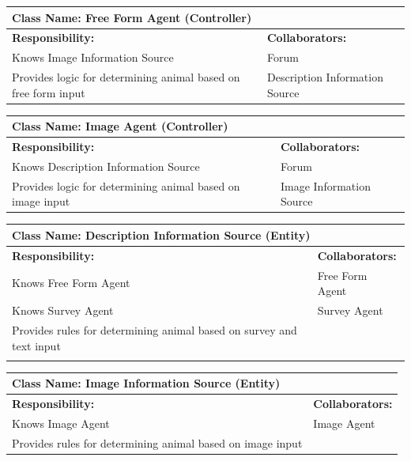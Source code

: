 \documentclass[]{article}
\begin{document}
    	\begin{table}[H]
		\centering
		\begin{tabular}{|p{7cm}|p{7cm}|}
		\hline 
		 \multicolumn{2}{|l|}{\textbf{Class Name: Free Form Agent (Controller)}} \\
		\hline
		\textbf{Responsibility:} & \textbf{Collaborators:} \\
		\hline
		Knows Image Information Source & Forum \\
        Provides logic for determining animal based on free form input & Description Information Source \\

		\hline
		\end{tabular}
	\end{table}


    	\begin{table}[H]
		\centering
		\begin{tabular}{|p{7cm}|p{7cm}|}
		\hline 
		 \multicolumn{2}{|l|}{\textbf{Class Name: Image Agent (Controller)}} \\
		\hline
		\textbf{Responsibility:} & \textbf{Collaborators:} \\
		\hline
		Knows Description Information Source  &  Forum		\\
        Provides logic for determining animal based on image input & Image Information Source \\
		\hline
		\end{tabular}
	\end{table}

	\begin{table}[H]
		\centering
		\begin{tabular}{|p{7cm}|p{7cm}|}
		\hline 
		 \multicolumn{2}{|l|}{\textbf{Class Name: Description Information Source (Entity)}} \\
		\hline
		\textbf{Responsibility:} & \textbf{Collaborators:} \\
		\hline
		Knows Free Form Agent & Free Form Agent \\
        Knows Survey Agent& Survey Agent \\
		Provides rules for determining animal based on survey and text input & \\
		\\
		\hline
		\end{tabular}
	\end{table}

    	\begin{table}[H]
		\centering
		\begin{tabular}{|p{7cm}|p{7cm}|}
		\hline 
		 \multicolumn{2}{|l|}{\textbf{Class Name: Image Information Source (Entity)}} \\
		\hline
		\textbf{Responsibility:} & \textbf{Collaborators:} \\
		\hline
		Knows Image Agent  &  Image Agent\\
        Provides rules for determining animal based on image input & \\
		\hline
		\end{tabular}
	\end{table}
	
\end{document}
